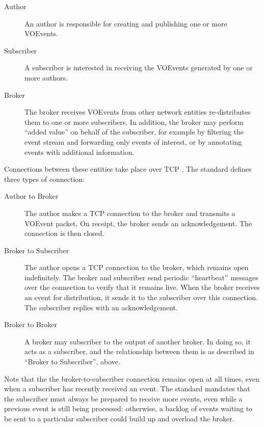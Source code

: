 \documentclass[5p,authoryear]{elsarticle}
\begin{document}
\begin{description}

  \item[Author]{An author is responsible for creating and publishing one or
  more VOEvents.}

  \item[Subscriber]{A subscriber is interested in receiving the VOEvents
  generated by one or more authors.}

  \item[Broker]{The broker receives VOEvents from other network entities
  re-distributes them to one or more subscribers. In addition, the broker may
  perform ``added value'' on behalf of the subscriber, for example by filtering
  the event stream and forwarding only events of interest, or by annotating
  events with additional information.}

\end{description}

Connections between these entities take place over TCP \citep{Cerf:1974}. The
standard defines three types of connection:

\begin{description}

  \item[Author to Broker]{The author makes a TCP connection to the broker and
  transmits a VOEvent packet. On receipt, the broker sends an acknowledgement.
  The connection is then closed.}

  \item[Broker to Subscriber]{The author opens a TCP connection to the broker,
  which remains open indefinitely. The broker and subscriber send periodic
  ``heartbeat'' messages over the connection to verify that it remains live.
  When the broker receives an event for distribution, it sends it to the
  subscriber over this connection. The subscriber replies with an
  acknowledgement.}

  \item[Broker to Broker]{A broker may subscriber to the output of another
  broker. In doing so, it acts as a subscriber, and the relationship between
  them is as described in ``Broker to Subscriber'', above.}

\end{description}

Note that the the broker-to-subscriber connection remains open at all times,
even when a subscriber has recently received an event. The standard mandates
that the subscriber must always be prepared to receive more events, even while
a previous event is still being processed: otherwise, a backlog of events
waiting to be sent to a particular subscriber could build up and overload the
broker.
\end{document}
